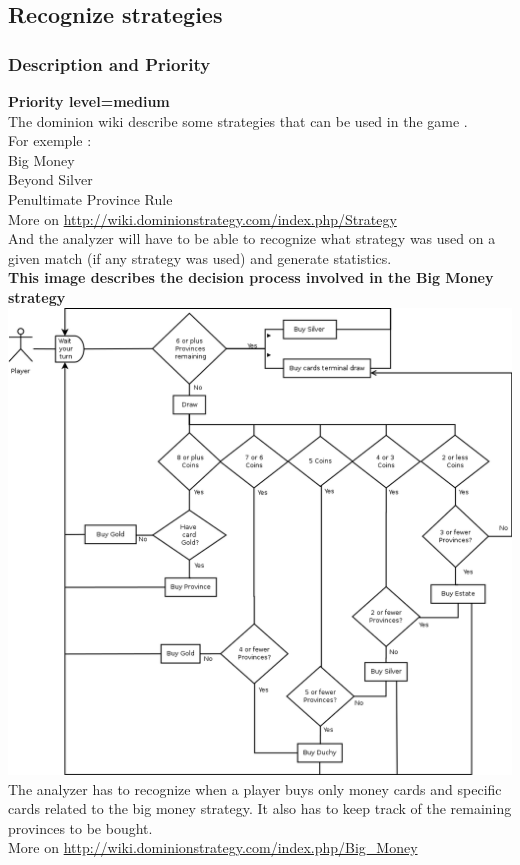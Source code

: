 \documentclass{scrreprt}
\begin{document}
\subsection{Recognize strategies}
\subsubsection{Description and Priority}
\textbf{Priority level=medium}\\

The dominion wiki describe some strategies that can be used in the game .\\ For exemple :\\
Big Money\\
Beyond Silver \\
Penultimate Province Rule \\
More on \url{http://wiki.dominionstrategy.com/index.php/Strategy}\\

And the analyzer will have to be able to recognize what strategy was used on a
given match (if any strategy was used) and generate statistics.\\
\textbf{This image describes the decision process involved in the Big Money strategy}\\
\includegraphics[width=\textwidth,height=\textheight,keepaspectratio]{big-money}\\
The analyzer has to recognize when a player buys only money cards and specific cards related to the big money strategy. It also has to keep track of the remaining provinces to be bought.\\
More on \url{http://wiki.dominionstrategy.com/index.php/Big_Money}\\
\end{document}
